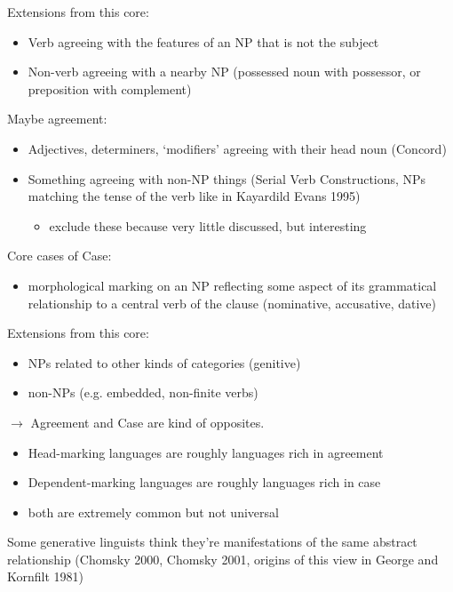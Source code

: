 Extensions from this core:

\begin{itemize}
  \item Verb agreeing with the features of an NP that is not the subject
  \item Non-verb agreeing with a nearby NP (possessed noun with possessor, or preposition with complement)
\end{itemize}

Maybe agreement:

\begin{itemize}
  \item Adjectives, determiners, `modifiers' agreeing with their head noun (Concord)
  \item Something agreeing with non-NP things (Serial Verb Constructions, NPs matching the tense of the verb like in Kayardild Evans 1995)
  \begin{itemize}
    \item exclude these because very little discussed, but interesting
  \end{itemize}
\end{itemize}

Core cases of Case:

\begin{itemize}
  \item morphological marking on an NP reflecting some aspect of its grammatical relationship to a central verb of the clause (nominative, accusative, dative)
\end{itemize}

Extensions from this core:

\begin{itemize}
  \item NPs related to other kinds of categories (genitive)
  \item non-NPs (e.g. embedded, non-finite verbs)
\end{itemize}

$\rightarrow$ Agreement and Case are kind of opposites.

\begin{itemize}
  \item Head-marking languages are roughly languages rich in agreement
  \item Dependent-marking languages are roughly languages rich in case
  \item both are extremely common but not universal
\end{itemize}

Some generative linguists think they're manifestations of the same abstract relationship (Chomsky 2000, Chomsky 2001, origins of this view in George and Kornfilt 1981)

